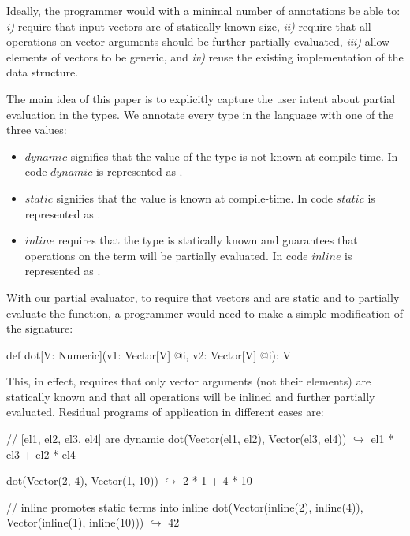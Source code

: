 Ideally, the programmer would with a minimal number of annotations be able to: \emph{i)} require
that input vectors are of statically known size, \emph{ii)} require that all operations on
vector arguments should be further partially evaluated, \emph{iii)} allow elements of
vectors to be generic, and \emph{iv)} reuse the existing implementation of the  data structure.

The main idea of this paper is to explicitly capture the user intent about partial
evaluation in the types. We annotate every type in the language with one of the three values:
\begin{itemize}
 \item $dynamic$ signifies that the value of the type is not known at compile-time. In code $dynamic$ is represented as .
 \item $static$ signifies that the value is known at compile-time. In code $static$ is represented as .
 \item $inline$ requires that the type is statically known and guarantees that operations on the term will be partially evaluated. In code $inline$ is represented as .
\end{itemize}

With our partial evaluator, to require that vectors  and  are static and
to partially evaluate the function, a programmer would need to make a simple modification of
the  signature:
\vspace{1.8mm}
\begin{listing}
  def dot[V: Numeric](v1: Vector[V] @i, v2: Vector[V] @i): V
\end{listing}
\vspace{1.8mm}
This, in effect, requires that only vector arguments (not their elements) are statically known and that all operations will be inlined and further partially evaluated. Residual programs of  application in different cases are:

\vspace{1.8mm}
\begin{listing}[mathescape]
  // [el1, el2, el3, el4] are dynamic
  dot(Vector(el1, el2), Vector(el3, el4))
    $\hookrightarrow$ el1 * el3 + el2 * el4

  dot(Vector(2, 4), Vector(1, 10))
    $\hookrightarrow$ 2 * 1 + 4 * 10

  // inline promotes static terms into inline
  dot(Vector(inline(2), inline(4)), Vector(inline(1), inline(10)))
    $\hookrightarrow$ 42
\end{listing}
\vspace{1.8mm}

